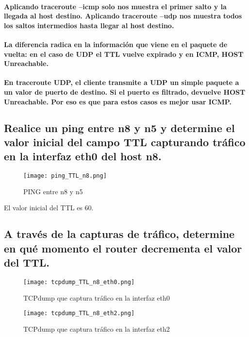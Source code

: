 \documentclass[11pt]{article} %
\begin{document}
        \paragraph{Aplicando traceroute --icmp solo nos muestra el primer salto y la llegada al host destino. Aplicando traceroute --udp nos muestra todos los saltos intermedios hasta llegar al host destino.}
 
        \paragraph{La diferencia radica en la información que viene en el paquete de vuelta: en el caso de UDP el TTL vuelve expirado y en ICMP, HOST Unreachable.}
        
        \paragraph{En traceroute UDP, el cliente transmite a UDP un simple paquete a un valor de puerto de destino. Si el puerto es filtrado, devuelve HOST Unreachable. Por eso es que para estos casos es mejor usar ICMP.}

        \subsection{Realice un ping entre n8 y n5 y determine el valor inicial del campo TTL capturando tráfico en la interfaz eth0 del host n8.}

        \begin{figure}[H]
            \centering
            \texttt{[image: ping\_TTL\_n8.png]}
            \caption{PING entre n8 y n5}
            \label{fig:ping_TTL_n8.png}
        \end{figure}

        El valor inicial del TTL es 60.

        \subsection{A través de la capturas de tráfico, determine en qué momento el router decrementa el valor del TTL.}

        \begin{figure}[H]
            \centering
            \texttt{[image: tcpdump\_TTL\_n8\_eth0.png]}
            \caption{TCPdump que captura tráfico en la interfaz eth0}
            \label{fig:tcpdump_TTL_n8_eth01}
        \end{figure}
        \begin{figure}[H]
            \centering
            \texttt{[image: tcpdump\_TTL\_n8\_eth2.png]}
            \caption{TCPdump que captura tráfico en la interfaz eth2}
            \label{fig:tcpdump_TTL_n8_eth2}
        \end{figure}
\end{document}
